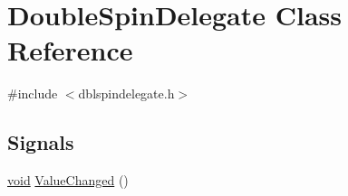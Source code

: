 \hypertarget{class_double_spin_delegate}{\section{\-Double\-Spin\-Delegate \-Class \-Reference}
\label{class_double_spin_delegate}
}


{\ttfamily \#include $<$dblspindelegate.\-h$>$}

\subsection*{\-Signals}
\begin{DoxyCompactItemize}
\item 
\hyperlink{group___u_a_v_objects_plugin_ga444cf2ff3f0ecbe028adce838d373f5c}{void} \hyperlink{group___config_plugin_ga71be1aadf5a0d023bda52f505cf7306f}{\-Value\-Changed} ()
\end{DoxyCompactItemize}
